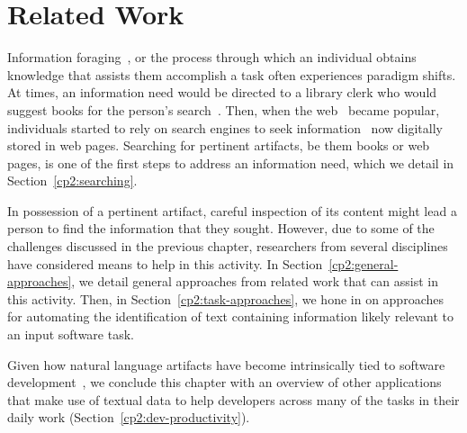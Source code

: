 \setcounter{chapter}{1}


\chapter{Related Work}
\label{ch:related-work}



Information foraging~\cite{Pirolli1999}, or the process through which an individual 
obtains knowledge that assists them accomplish a task often experiences paradigm shifts. 
At times, 
an information need would be directed to a library clerk who would suggest books for the person's search~\cite{saracevic1975}.
Then, when the \acf{web}~\cite{berners1994web} became popular,
individuals started to rely on search engines 
to seek information~\cite{Page1999} now digitally stored in web pages.
Searching for pertinent artifacts, be them books or web pages, 
is one of the first steps to address an information need,
which we detail in Section~\ref{cp2:searching}.


In possession of a pertinent artifact, careful 
inspection of its content might lead a person 
to find the information that they sought. 
However, due to some of the challenges
discussed in the previous chapter, researchers from several 
disciplines have considered means to help 
in this activity. 
In Section~\ref{cp2:general-approaches}, 
we detail general approaches from related work
that can assist in this activity. 
Then, in Section~\ref{cp2:task-approaches}, 
we hone in on approaches for automating the identification of text 
containing information likely relevant to an input software task.




Given how 
natural language artifacts have become intrinsically
tied to software development~\cite{umarji2008archetypal},
we conclude this chapter with an overview of 
other applications that make use of textual data
to help developers
across many of the tasks in their daily work (Section~\ref{cp2:dev-productivity}).


